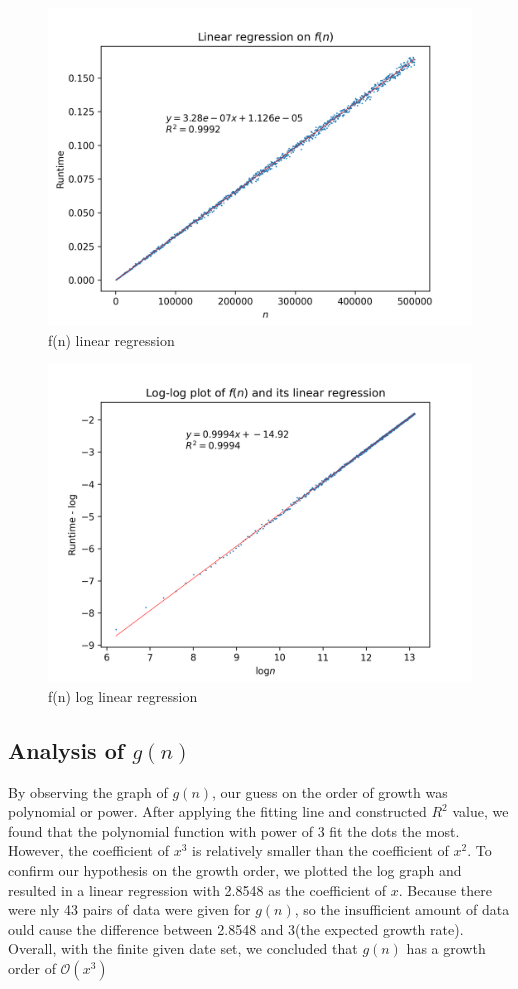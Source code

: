 \documentclass[titlepage, 12pt]{article}
\begin{document}
\begin{figure}[h]
    \includegraphics[width=\linewidth]{fn-linreg.png}
    \caption{f(n) linear regression}
\end{figure}
\begin{figure}[h]
    \includegraphics[width=\linewidth]{fn-log-linreg.png}
    \caption{f(n) log linear regression}
\end{figure}

\subsection{Analysis of $g(n)$}
By observing the graph of $g(n)$, our guess on the order of growth was polynomial 
or power. After applying the fitting line and constructed $R^{2}$ value, we found 
that the polynomial function with power of 3 fit the dots the most. However, 
the coefficient of $x^{3}$ is relatively smaller than the coefficient of $x^{2}$. To 
confirm our hypothesis on the growth order, we plotted the log graph and resulted 
in a linear regression with 2.8548 as the coefficient of $x$. Because there were 
nly 43 pairs of data were given for $g(n)$, so the insufficient amount of data 
ould cause the difference between 2.8548 and 3(the expected growth rate). 
Overall, with the finite given date set, we concluded that $g(n)$ has a growth 
order of $\mathcal{O}(x^{3})$
\end{document}
